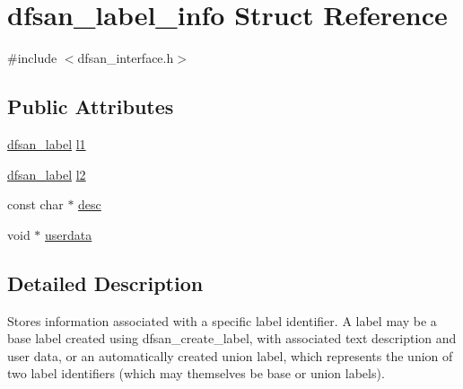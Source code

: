 \hypertarget{structdfsan__label__info}{\section{dfsan\-\_\-label\-\_\-info Struct Reference}
\label{structdfsan__label__info}
}


{\ttfamily \#include $<$dfsan\-\_\-interface.\-h$>$}

\subsection*{Public Attributes}
\begin{DoxyCompactItemize}
\item 
\hyperlink{dfsan__interface_8h_a687a0bc144baaef2e10771b604c1ac75}{dfsan\-\_\-label} \hyperlink{structdfsan__label__info_a82901a96164283d57c24275e2d3a7ead}{l1}
\item 
\hyperlink{dfsan__interface_8h_a687a0bc144baaef2e10771b604c1ac75}{dfsan\-\_\-label} \hyperlink{structdfsan__label__info_a6b9bf4180217f8f3d3fd62ebfbe3e3fd}{l2}
\item 
const char $\ast$ \hyperlink{structdfsan__label__info_a8633e0763c04793542a3c2d4875a84c8}{desc}
\item 
void $\ast$ \hyperlink{structdfsan__label__info_a66abef76ed966704b1b87bb07ad205a6}{userdata}
\end{DoxyCompactItemize}


\subsection{Detailed Description}
Stores information associated with a specific label identifier. A label may be a base label created using dfsan\-\_\-create\-\_\-label, with associated text description and user data, or an automatically created union label, which represents the union of two label identifiers (which may themselves be base or union labels). 

